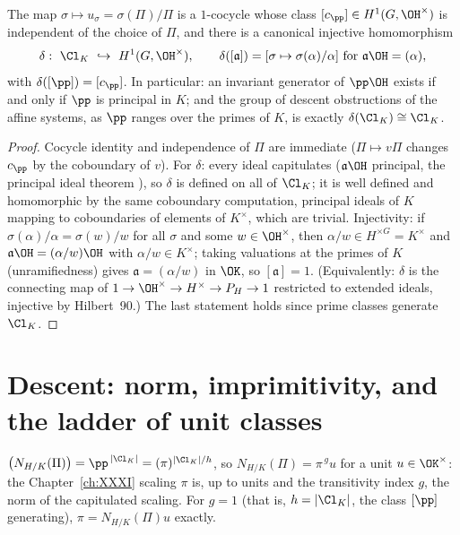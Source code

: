 \begin{theorem}\label{XXXII:thm:obstruction}
The map $\sigma\mapsto u_\sigma=\sigma(\Pi)/\Pi$ is a $1$-cocycle whose class
$[c_\pp]\in H^1(G,\OH^\times)$ is independent of the choice of $\Pi$, and there is a
canonical injective homomorphism
\[
\delta:\ \Cl_K\ \hookrightarrow\ H^1(G,\OH^\times),\qquad
\delta([\mathfrak a])=[\sigma\mapsto\sigma(\alpha)/\alpha]\ \text{for}\
\mathfrak a\OH=(\alpha),
\]
with $\delta([\pp])=[c_\pp]$. In particular: an invariant generator of $\pp\OH$ exists if
and only if $\pp$ is principal in $K$; and the group of descent obstructions of the
affine systems, as $\pp$ ranges over the primes of $K$, is exactly $\delta(\Cl_K)\cong
\Cl_K$.
\end{theorem}

\begin{proof}
Cocycle identity and independence of $\Pi$ are immediate ($\Pi\mapsto v\Pi$ changes
$c_\pp$ by the coboundary of $v$). For $\delta$: every ideal capitulates
($\mathfrak a\OH$ principal, the principal ideal theorem \cite[VI.7]{Neukirch}), so
$\delta$ is defined on all of $\Cl_K$; it is well defined and homomorphic by the same
coboundary computation, principal ideals of $K$ mapping to coboundaries of elements of
$K^\times$, which are trivial. Injectivity: if $\sigma(\alpha)/\alpha=\sigma(w)/w$ for
all $\sigma$ and some $w\in\OH^\times$, then $\alpha/w\in H^{\times G}=K^\times$ and
$\mathfrak a\OH=(\alpha/w)\OH$ with $\alpha/w\in K^\times$; taking valuations at the
primes of $K$ (unramifiedness) gives $\mathfrak a=(\alpha/w)$ in $\OK$, so
$[\mathfrak a]=1$. (Equivalently: $\delta$ is the connecting map of
$1\to\OH^\times\to H^\times\to P_H\to1$ restricted to extended ideals, injective by
Hilbert~90.) The last statement holds since prime classes generate $\Cl_K$.
\end{proof}

\section{Descent: norm, imprimitivity, and the ladder of unit classes}\label{XXXII:sec:descent}

\begin{proposition}\label{XXXII:prop:norm}
$\bigl(N_{H/K}(\Pi)\bigr)=\pp^{\,|\Cl_K|}=(\pi)^{|\Cl_K|/h}$, so
$N_{H/K}(\Pi)=\pi^{\,g}u$ for a unit $u\in\OK^\times$: the Chapter~\ref{ch:XXXI} scaling $\pi$ is,
up to units and the transitivity index $g$, the norm of the capitulated scaling.
For $g=1$ (that is, $h=|\Cl_K|$, the class $[\pp]$ generating), $\pi=N_{H/K}(\Pi)u$
exactly.
\end{proposition}

